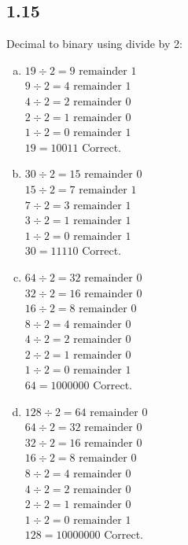 \documentclass{article}
\begin{document}
\subsection*{1.15}
Decimal to binary using divide by 2:
\begin{enumerate}[(a)]
    \item 
    $19 \div 2 = 9 \text{ remainder } 1$ \\
    $9 \div 2 = 4 \text{ remainder } 1$ \\
    $4 \div 2 = 2 \text{ remainder } 0$ \\
    $2 \div 2 = 1 \text{ remainder } 0$ \\
    $1 \div 2 = 0 \text{ remainder } 1$ \\
    $19 = 10011$ \textcolor{mygreen}{Correct.}
    \item 
    $30 \div 2 = 15 \text{ remainder } 0$ \\
    $15 \div 2 = 7 \text{ remainder } 1$ \\
    $7 \div 2 = 3 \text{ remainder } 1$ \\
    $3 \div 2 = 1 \text{ remainder } 1$ \\
    $1 \div 2 = 0 \text{ remainder } 1$ \\
    $30 = 11110$ \textcolor{mygreen}{Correct.}
    \item 
    $64 \div 2 = 32 \text{ remainder } 0$ \\
    $32 \div 2 = 16 \text{ remainder } 0$ \\
    $16 \div 2 = 8 \text{ remainder } 0$ \\
    $8 \div 2 = 4 \text{ remainder } 0$ \\
    $4 \div 2 = 2 \text{ remainder } 0$ \\
    $2 \div 2 = 1 \text{ remainder } 0$ \\
    $1 \div 2 = 0 \text{ remainder } 1$ \\
    $64 = 1000000$ \textcolor{mygreen}{Correct.}
    \newpage
    \item 
    $128 \div 2 = 64 \text{ remainder } 0$ \\
    $64 \div 2 = 32 \text{ remainder } 0$ \\
    $32 \div 2 = 16 \text{ remainder } 0$ \\
    $16 \div 2 = 8 \text{ remainder } 0$ \\
    $8 \div 2 = 4 \text{ remainder } 0$ \\
    $4 \div 2 = 2 \text{ remainder } 0$ \\
    $2 \div 2 = 1 \text{ remainder } 0$ \\
    $1 \div 2 = 0 \text{ remainder } 1$ \\
    $128 = 10000000$ \textcolor{mygreen}{Correct.}
\end{enumerate}
\end{document}
